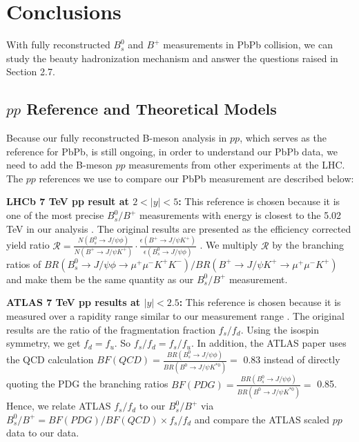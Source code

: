 \chapter{Conclusions}

With fully reconstructed $B^0_s$ and $B^+$ measurements in PbPb collision, we can study the beauty hadronization mechanism and answer the questions raised in Section 2.7.

\section{$pp$ Reference and Theoretical Models}

Because our fully reconstructed B-meson analysis in $pp$, which serves as the reference for PbPb, is still ongoing, in order to understand our PbPb data, we need to add the B-meson $pp$ measurements from other experiments at the LHC. The $pp$ references we use to compare our PbPb measurement are described below:

\textbf{LHCb 7 TeV pp result at $2 < |y| < 5$:} This reference is chosen because it is one of the most precise $B^0_s/B^+$ measurements with energy is closest to the 5.02 TeV in our analysis \cite{LHCbFF}. The original results are presented as the efficiency corrected yield ratio $\mathcal{R} = \frac{N(B^0_s \rightarrow J/\psi \phi)}{N(B^+ \rightarrow J/\psi K^+)} \cdot \frac{\epsilon(B^+ \rightarrow J/\psi K^+)}{\epsilon(B^0_s \rightarrow J/\psi \phi)}$ \cite{LHCbFF}. We multiply $\mathcal{R}$ by the branching ratios of $BR(B^0_s \rightarrow J/\psi \phi \rightarrow \mu^+\mu^- K^+ K^-)/BR(B^+ \rightarrow J/\psi K^+ \rightarrow \mu^+\mu^- K^+)$ and make them be the same quantity as our $B^0_s/B^+$ measurement.

\textbf{ATLAS 7 TeV pp results at $|y| < 2.5$:} This reference is chosen because it is measured over a rapidity range similar to our measurement range \cite{ATLASPPRef}. The original results are the ratio of the fragmentation fraction $f_s/f_d$. Using the isospin symmetry, we get $f_d = f_u$. So $f_s/f_d = f_s/f_u$. In addition, the ATLAS paper uses the QCD calculation $BF(QCD) = \frac{BR(B^0_s \rightarrow J/\psi \phi)}{BR(B^0 \rightarrow J/\psi K^{*0})} =$ 0.83 instead of directly quoting the PDG the branching ratios $BF(PDG) = \frac{BR(B^0_s \rightarrow J/\psi \phi)}{BR(B^0 \rightarrow J/\psi K^{*0})} =$ 0.85. Hence, we relate ATLAS $f_s/f_d$ to our $B^0_s/B^+$ via $B^0_s/B^+ = BF(PDG)/BF(QCD) \times f_s/f_d$ and compare the ATLAS scaled $pp$ data to our data.


